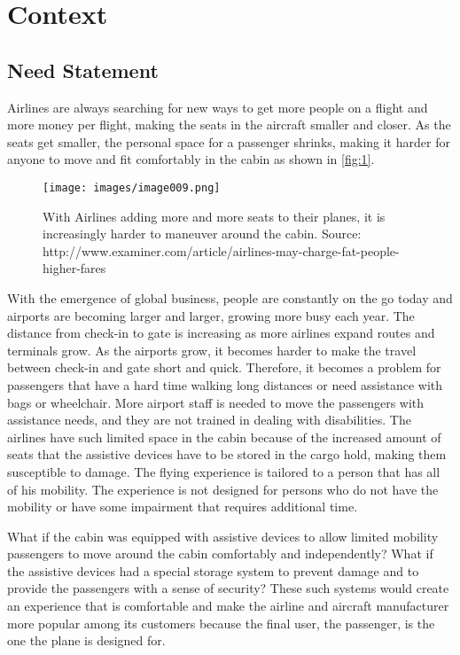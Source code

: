 \chapter{Context}

\section{Need Statement}
Airlines are always searching for new ways to get more people on a flight and more money per flight, making the seats in the aircraft smaller and closer. As the seats get smaller, the personal space for a passenger shrinks, making it harder for anyone to move and fit comfortably in the cabin as shown in \ref{fig:1}.

\begin{figure}[h]
  \centering
     \texttt{[image: images/image009.png]}
   \caption{With Airlines adding more and more seats to their planes, it is increasingly harder to maneuver around the cabin.
                  Source: http://www.examiner.com/article/airlines-may-charge-fat-people-higher-fares}
  \label{fig:9}
\end{figure}

With the emergence of global business, people are constantly on the go today and airports are becoming larger and larger, growing more busy each year.  The distance from check-in to gate is increasing as more airlines expand routes and terminals grow.  As the airports grow, it becomes harder to make the travel between check-in and gate short and quick.  Therefore, it becomes a problem for passengers that have a hard time walking long distances or need assistance with bags or wheelchair. More airport staff is needed to move the passengers with assistance needs, and they are not trained in dealing with disabilities.  The airlines have such limited space in the cabin because of the increased amount of seats that the assistive devices have to be stored in the cargo hold, making them susceptible to damage.  The flying experience is tailored to a person that has all of his mobility. The experience is not designed for persons who do not have the mobility or have some impairment that requires additional time. 

What if the cabin was equipped with assistive devices to allow limited mobility passengers to move around the cabin comfortably and independently? What if the assistive devices had a special storage system to prevent damage and to provide the passengers with a sense of security?  These such systems would create an experience that is comfortable and make the airline and aircraft manufacturer more popular among its customers because the final user, the passenger, is the one the plane is designed for. 


